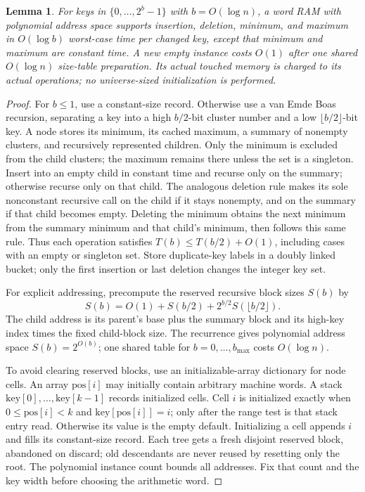 \documentclass[11pt]{article}
\newtheorem{lemma}[theorem]{Lemma}
\theoremstyle{remark}
\begin{document}
\begin{lemma}
\label{lem:ram-deadline-index}
For keys in $\{0,\ldots,2^b-1\}$ with $b=O(\log n)$, a word RAM with polynomial
address space supports insertion, deletion, minimum, and maximum in $O(\log b)$
worst-case time per changed key, except that minimum and maximum are constant
time.
A new empty instance costs $O(1)$ after one shared $O(\log n)$ size-table
preparation.
Its actual touched memory is charged to its actual operations; no universe-sized
initialization is performed.
\end{lemma} \begin{proof} For $b\le1$, use a constant-size record.
Otherwise use a van Emde Boas recursion, separating a key into a high $ b/2 $-bit cluster number and a low $\lfloor b/2\rfloor$-bit key.
A node stores its minimum, its cached maximum, a summary of nonempty clusters,
and recursively represented children.
Only the minimum is excluded from the child clusters; the maximum remains there
unless the set is a singleton.
Insert into an empty child in constant time and recurse only on the summary;
otherwise recurse only on that child.
The analogous deletion rule makes its sole nonconstant recursive call on the
child if it stays nonempty, and on the summary if that child becomes empty.
Deleting the minimum obtains the next minimum from the summary minimum and that
child's minimum, then follows this same rule.
Thus each operation satisfies $T(b)\le T( b/2 )+O(1)$, including
cases with an empty or singleton set.
Store duplicate-key labels in a doubly linked bucket; only the first insertion
or last deletion changes the integer key set.

For explicit addressing, precompute the reserved recursive block sizes $S(b)$ by
\[
 S(b)=O(1)+S( b/2 )
                    +2^{ b/2 }S(\lfloor b/2\rfloor).
\]
The child address is its parent's base plus the summary block and its high-key
index times the fixed child-block size.
The recurrence gives polynomial address space $S(b)=2^{O(b)}$; one shared table
for $b=0,\ldots,b_{\max}$ costs $O(\log n)$.

To avoid clearing reserved blocks, use an initializable-array dictionary for
node cells.
An array $\mathrm{pos}[i]$ may initially contain arbitrary machine words.
A stack $\mathrm{key}[0],\ldots,\mathrm{key}[k-1]$ records initialized cells.
Cell $i$ is initialized exactly when $0\le\mathrm{pos}[i]<k$ and
$\mathrm{key}[\mathrm{pos}[i]]=i$; only after the range test is that stack entry
read.
Otherwise its value is the empty default.
Initializing a cell appends $i$ and fills its constant-size record.
Each tree gets a fresh disjoint reserved block, abandoned on discard; old
descendants are never reused by resetting only the root.
The polynomial instance count bounds all addresses.
Fix that count and the key width before choosing the arithmetic word.
\end{proof}
\end{document}
